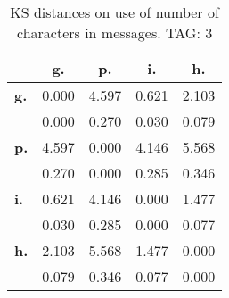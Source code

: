 \begin{table}[h!]
\begin{center}
\begin{tabular}{| l || c | c | c | c |}\hline
 & {\bf g.} & {\bf p.} & {\bf i.} & {\bf h.} \\\hline\hline
{\bf g.} & 0.000 & 4.597 & 0.621 & 2.103 \\
{\bf } & 0.000 & 0.270 & 0.030 & 0.079 \\\hline
{\bf p.} & 4.597 & 0.000 & 4.146 & 5.568 \\
{\bf } & 0.270 & 0.000 & 0.285 & 0.346 \\\hline
{\bf i.} & 0.621 & 4.146 & 0.000 & 1.477 \\
{\bf } & 0.030 & 0.285 & 0.000 & 0.077 \\\hline
{\bf h.} & 2.103 & 5.568 & 1.477 & 0.000 \\
{\bf } & 0.079 & 0.346 & 0.077 & 0.000 \\\hline
\end{tabular}
\caption{KS distances on use of number of characters in messages. TAG: 3}
\end{center}
\end{table}